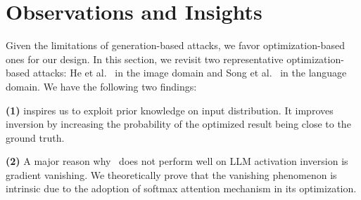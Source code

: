\section{Observations and Insights}%
\label{sec:revisit}

Given the limitations of  generation-based attacks, we favor optimization-based ones for our design. %
In this section, we revisit two representative optimization-based attacks: He et al.~\cite{he2019model} in the image domain and Song et al.~\cite{song2020information} in the language domain. We have the following two findings:  

\noindent
\textbf{(1)} 
\cite{he2019model} inspires us to exploit prior knowledge on input distribution. It improves inversion by increasing the probability of the optimized result being close to the ground truth.

\noindent
\textbf{(2)} A major reason why~\cite{song2020information} does not perform well on LLM activation inversion is gradient vanishing. We theoretically prove that the vanishing phenomenon is intrinsic due to the adoption of softmax attention mechanism in its optimization. 




